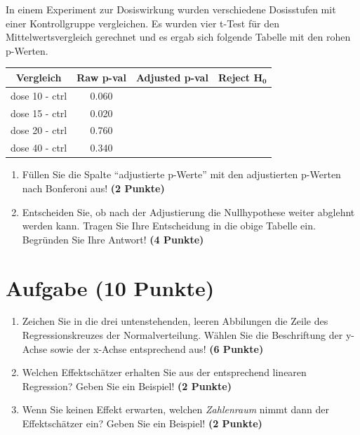 \documentclass[a4paper, 10pt]{scrartcl}\usepackage[]{graphicx}\usepackage[]{color}
\begin{document}
In einem Experiment zur Dosiswirkung wurden verschiedene Dosisstufen mit
einer Kontrollgruppe vergleichen. Es wurden vier t-Test f{\"u}r den
Mittelwertsvergleich gerechnet und es ergab sich folgende Tabelle mit den
rohen p-Werten.



\begin{center}
  \Large
  \begin{tabular}{c|c|c|c}
    \textbf{Vergleich} & \textbf{Raw p-val} & \textbf{Adjusted p-val} &
                                                                        \textbf{Reject $\boldsymbol{H_0}$} \strut\\
    \hline
    dose 10 - ctrl  & 0.060 &  &\strut\\
    \hline
    dose 15 - ctrl  & 0.020 & &\strut\\
    \hline
    dose 20 - ctrl  & 0.760 & &\strut\\
    \hline
    dose 40 - ctrl  & 0.340 & &\strut\\
  \end{tabular}
\end{center}

\begin{enumerate}
\item F{\"u}llen Sie die Spalte "`adjustierte p-Werte"' mit den adjustierten
  p-Werten nach Bonferoni aus! \textbf{(2 Punkte)}
\item Entscheiden Sie, ob nach der Adjustierung die Nullhypothese weiter
  abglehnt werden kann. Tragen Sie Ihre Entscheidung in die obige Tabelle
  ein. Begr{\"u}nden Sie Ihre Antwort! \textbf{(4 Punkte)}
\end{enumerate}

\vspace{1Ex}

 
\clearpage

\section{Aufgabe \hfill (10 Punkte)}



\begin{enumerate}
\item Zeichen Sie in die drei untenstehenden, leeren Abbilungen die Zeile des
  Regressionskreuzes der Normalverteilung. W{\"a}hlen Sie die Beschriftung der
  y-Achse sowie der x-Achse entsprechend aus! \textbf{(6 Punkte)}
\item Welchen Effektsch{\"a}tzer erhalten Sie aus der entsprechend linearen
  Regression? Geben Sie ein Beispiel! \textbf{(2 Punkte)}
\item Wenn Sie keinen Effekt erwarten, welchen \textit{Zahlenraum} nimmt dann
  der Effektsch{\"a}tzer ein? Geben Sie ein Beispiel! \textbf{(2 Punkte)}
\end{enumerate}
\end{document}
